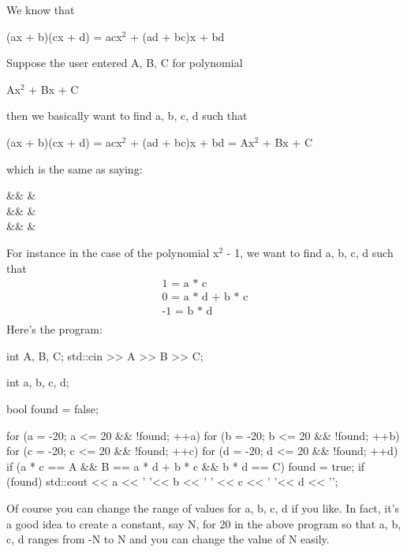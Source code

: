\begin{console}
We know that
\begin{center}
(ax + b)(cx + d) = acx$^2$ + (ad + bc)x + bd
\end{center}
Suppose the user entered A, B, C for polynomial
\begin{center}
Ax$^2$ + Bx + C
\end{center}
then we basically want to find a, b, c, d such that
\begin{center}
(ax + b)(cx + d) = acx$^2$ + (ad + bc)x + bd = Ax$^2$ + Bx + C
\end{center}
which is the same as saying:
\begin{flalign*}
&& &\\
&& &\\
&& &\\
\end{flalign*}
For instance in the case of the polynomial x$^{2}$ - 1, we
want to find a, b, c, d such that
\begin{align*}
\text{1 = a * c}\\
\text{0 = a * d + b * c}\\
\text{-1 = b * d}\\
\end{align*}
Here's the program:
\begin{console}
int A, B, C;
std::cin >> A >> B >> C;

int a, b, c, d;

bool found = false;

for (a = -20; a <= 20 && !found; ++a)
{   
    for (b = -20; b <= 20 && !found; ++b)
    {   
        for (c = -20; c <= 20 && !found; ++c)
        {
        for (d = -20; d <= 20 && !found; ++d)
        {
            if (a * c == A
                 && B == a * d + b * c
                 && b * d == C)
            {  
                    found = true;
            }
        }
     }
}
if (found)
{  
   std::cout << a << ' '<< b
             << ' ' << c << ' '<< d << '\n';
}
}
\end{console}
Of course you can change the range of values for a, b, c, d if you like.
In fact, it's a good idea to create a constant, say N,
for 20 in the above program so that a, b, c, d ranges from -N to N and
you can change the value of N easily.


\end{console}

